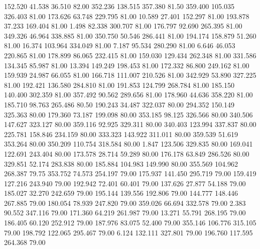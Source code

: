  152.520   41.538   36.510        82.00
 352.236  138.515  357.380        81.50
 359.400  105.035  326.403        81.00
 173.626   63.748  229.795        81.00
  10.589   27.401  152.297        81.00
 193.878   37.233  169.404        81.00
   1.498   82.338  300.707        81.00
 176.797   92.690  265.395        81.00
 349.326   46.964  338.885        81.00
 350.750   50.546  286.441        81.00
 194.174  158.879   51.260        81.00
  16.374  103.964  334.049        81.00
   7.187   95.534  280.290        81.00
   6.646   46.053  220.865        81.00
 178.899   86.065  232.415        81.00
 159.030  129.434  262.348        81.00
 331.586  134.345   85.987        81.00
  13.394  149.249  198.453        81.00
 172.332   86.800  249.162        81.00
 159.939   24.987   66.055        81.00
 166.718  111.007  210.526        81.00
 342.929   53.890  327.225        81.00
 192.421  136.580  284.810        81.00
 191.853  124.799  268.784        81.00
 185.150  140.400  302.359        81.00
 357.492   90.562  289.656        81.00
 178.960   44.636  358.220        81.00
 185.710   98.763  265.486        80.50
 190.243   34.487  322.037        80.00
 294.352  150.149  325.363        80.00
 179.360   73.187  199.098        80.00
 353.185   98.125  326.566        80.00
 340.506  147.627  323.127        80.00
 359.116   92.925  329.311        80.00
 340.403  123.994  337.837        80.00
 225.781  158.846  234.159        80.00
 333.323  143.922  311.011        80.00
 359.539   51.619  353.264        80.00
 350.209  110.754  318.584        80.00
   1.847  123.506  329.835        80.00
 169.041  122.691  243.404        80.00
 173.578   28.714   59.289        80.00
 176.178   63.849  286.526        80.00
 329.851   52.174  283.838        80.00
 185.884  104.983  149.990        80.00
 355.569  104.962  268.387        79.75
 353.752   74.573  254.197        79.00
 175.937  141.450  295.719        79.00
 159.419  127.216  243.940        79.00
 192.942   72.401   60.401        79.00
 137.626   27.877   54.188        79.00
 185.027   32.270  242.659        79.00
 195.144  139.556  192.806        79.00
 144.777  148.446  267.885        79.00
 180.054   78.939  247.820        79.00
 359.026   66.694  332.578        79.00
   2.383   90.552  347.116        79.00
 171.360   64.219  261.987        79.00
  13.271   55.791  268.195        79.00
 186.405   60.120  252.912        79.00
 187.976   83.075   52.400        79.00
 355.146  106.776  315.105        79.00
 198.792  122.065  295.467        79.00
   6.124  132.111  327.801        79.00
 196.760  117.595  264.368        79.00
